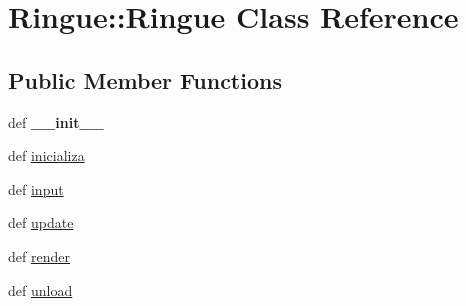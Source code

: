 \hypertarget{class_ringue_1_1_ringue}{
\section{Ringue::Ringue Class Reference}
\label{class_ringue_1_1_ringue}
}
\subsection*{Public Member Functions}
\begin{CompactItemize}
\item 
\hypertarget{class_ringue_1_1_ringue_2856f741e3a3a1485ff36ae4e2728a13}{
def \textbf{\_\-\_\-init\_\-\_\-}}
\label{class_ringue_1_1_ringue_2856f741e3a3a1485ff36ae4e2728a13}

\item 
def \hyperlink{class_ringue_1_1_ringue_73fd368a6647d9f4414cfaf8499d1c43}{inicializa}
\item 
def \hyperlink{class_ringue_1_1_ringue_dc4bdb8ddd4d0138ff7911365893e102}{input}
\item 
def \hyperlink{class_ringue_1_1_ringue_7a7f7bcc12547dd5ea87b0b8fa7540ea}{update}
\item 
def \hyperlink{class_ringue_1_1_ringue_14225440624ea7fa7fe6414609521211}{render}
\item 
def \hyperlink{class_ringue_1_1_ringue_43bae6bbbab438c41367fd2248dec6b6}{unload}
\end{CompactItemize}
